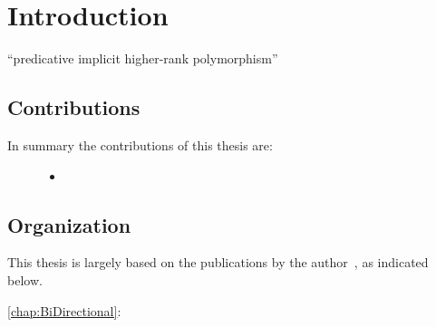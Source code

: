 \chapter{Introduction}

``predicative implicit higher-rank polymorphism''

\section{Contributions}

In summary the contributions of this thesis are:


\begin{description}
\item[]
  \begin{itemize}
  \item ~
  \end{itemize}
\end{description}


\section{Organization}

This thesis is largely based on the
publications by the author~\citep{},
as indicated below.
\begin{description}
\item[\cref{chap:BiDirectional}:]~
\end{description}


\noindent\makebox[\linewidth]{\rule{0.7\textwidth}{0.4pt}}

\vspace{1.5\baselineskip}









